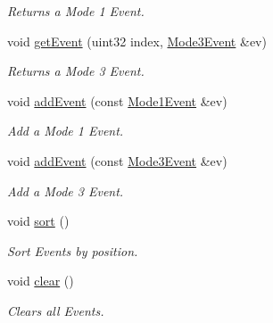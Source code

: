\begin{DoxyCompactItemize}
\begin{DoxyCompactList}\small\item\em Returns a Mode 1 Event. \item\end{DoxyCompactList}\item 
\hypertarget{classgdf_1_1_event_header_a4dca894e55f6fe5a0ce36b2b4716d505}{
void \hyperlink{classgdf_1_1_event_header_a4dca894e55f6fe5a0ce36b2b4716d505}{getEvent} (uint32 index, \hyperlink{structgdf_1_1_mode3_event}{Mode3Event} \&ev)}
\label{classgdf_1_1_event_header_a4dca894e55f6fe5a0ce36b2b4716d505}

\begin{DoxyCompactList}\small\item\em Returns a Mode 3 Event. \item\end{DoxyCompactList}\item 
\hypertarget{classgdf_1_1_event_header_a0f58d00c6e0952d1f0c4cf0a105dcbf4}{
void \hyperlink{classgdf_1_1_event_header_a0f58d00c6e0952d1f0c4cf0a105dcbf4}{addEvent} (const \hyperlink{structgdf_1_1_mode1_event}{Mode1Event} \&ev)}
\label{classgdf_1_1_event_header_a0f58d00c6e0952d1f0c4cf0a105dcbf4}

\begin{DoxyCompactList}\small\item\em Add a Mode 1 Event. \item\end{DoxyCompactList}\item 
\hypertarget{classgdf_1_1_event_header_a44265a33a67ebbc25b38a6b1809ef9d4}{
void \hyperlink{classgdf_1_1_event_header_a44265a33a67ebbc25b38a6b1809ef9d4}{addEvent} (const \hyperlink{structgdf_1_1_mode3_event}{Mode3Event} \&ev)}
\label{classgdf_1_1_event_header_a44265a33a67ebbc25b38a6b1809ef9d4}

\begin{DoxyCompactList}\small\item\em Add a Mode 3 Event. \item\end{DoxyCompactList}\item 
\hypertarget{classgdf_1_1_event_header_acd6ea2733587c141979fdd0fb5942eb9}{
void \hyperlink{classgdf_1_1_event_header_acd6ea2733587c141979fdd0fb5942eb9}{sort} ()}
\label{classgdf_1_1_event_header_acd6ea2733587c141979fdd0fb5942eb9}

\begin{DoxyCompactList}\small\item\em Sort Events by position. \item\end{DoxyCompactList}\item 
\hypertarget{classgdf_1_1_event_header_ac78d98343e8bc7fb60c0c7029247ecd0}{
void \hyperlink{classgdf_1_1_event_header_ac78d98343e8bc7fb60c0c7029247ecd0}{clear} ()}
\label{classgdf_1_1_event_header_ac78d98343e8bc7fb60c0c7029247ecd0}

\begin{DoxyCompactList}\small\item\em Clears all Events. \item\end{DoxyCompactList}\end{DoxyCompactItemize}
